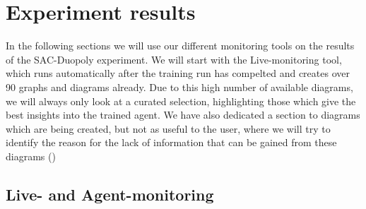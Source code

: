 
\section*{Experiment results}

In the following sections we will use our different monitoring tools on the results of the SAC-Duopoly experiment. We will start with the Live-monitoring tool, which runs automatically after the training run has compelted and creates over 90 graphs and diagrams already. Due to this high number of available diagrams, we will always only look at a curated selection, highlighting those which give the best insights into the trained agent. We have also dedicated a section to diagrams which are being created, but not as useful to the user, where we will try to identify the reason for the lack of information that can be gained from these diagrams ()

\subsection*{Live- and Agent-monitoring}\label{subsec:LiveMonitoringResults}

